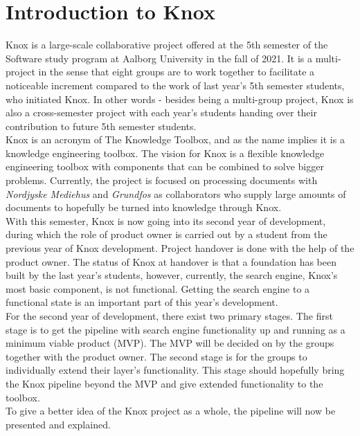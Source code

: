 \chapter{Introduction to Knox}
\tiny {}

Knox is a large-scale collaborative project offered at the 5th semester of the Software study program at Aalborg University in the fall of 2021. It is a multi-project in the sense that eight groups are to work together to facilitate a noticeable increment compared to the work of last year's 5th semester students, who initiated Knox. In other words - besides being a multi-group project, Knox is also a cross-semester project with each year's students handing over their contribution to future 5th semester students.\\

Knox is an acronym of The Knowledge Toolbox, and as the name implies it is a knowledge engineering toolbox. The vision for Knox is a flexible knowledge engineering toolbox with components that can be combined to solve bigger problems. Currently, the project is focused on processing documents with \textit{Nordjyske Mediehus} and \textit{Grundfos} as collaborators who supply large amounts of documents to hopefully be turned into knowledge through Knox.\\

With this semester, Knox is now going into its second year of development, during which the role of product owner is carried out by a student from the previous year of Knox development. Project handover is done with the help of the product owner. The status of Knox at handover is that a foundation has been built by the last year's students, however, currently, the search engine, Knox's most basic component, is not functional. Getting the search engine to a functional state is an important part of this year's development.\\

For the second year of development, there exist two primary stages.
The first stage is to get the pipeline with search engine functionality up and running as a minimum viable product (MVP). The MVP will be decided on by the groups together with the product owner. The second stage is for the groups to individually extend their layer's functionality. This stage should hopefully bring the Knox pipeline beyond the MVP and give extended functionality to the toolbox.\\

To give a better idea of the Knox project as a whole, the pipeline will now be presented and explained. 






